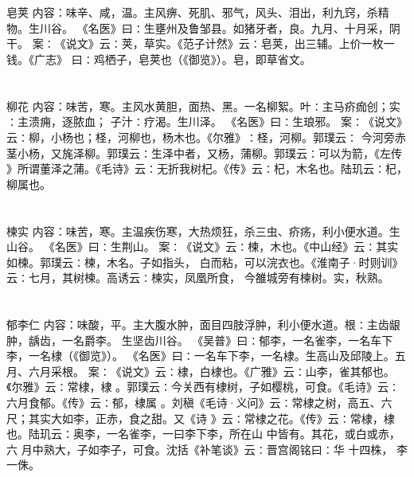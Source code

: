\documentclass[12pt,UTF8]{ctexbook}
\begin{document}
\chapter{}皂荚
内容：味辛、咸，温。主风痹、死肌、邪气，风头、泪出，利九窍，杀精物。生川谷。 
《名医》曰∶生壅州及鲁邹县。如猪牙者，良。九月、十月采，阴干。 
案∶《说文》云∶荚，草实。《范子计然》云∶皂荚，出三辅。上价一枚一钱。《广志》 
曰∶鸡栖子，皂荚也（《御览》）。皂，即草省文。 


\chapter{}柳花
内容：味苦，寒。主风水黄胆，面热、黑。一名柳絮。叶∶主马疥痂创；实∶主溃痈，逐脓血； 
子汁∶疗渴。生川泽。 
《名医》曰∶生琅邪。 
案∶《说文》云∶柳，小杨也；柽，河柳也，杨木也。《尔雅》∶柽，河柳。郭璞云∶ 
今河旁赤茎小杨，又旄泽柳。郭璞云∶生泽中者，又杨，蒲柳。郭璞云∶可以为箭，《左传 
》所谓董泽之蒲。《毛诗》云∶无折我树杞。《传》云∶杞，木名也。陆玑云∶杞，柳属也。 


\chapter{}楝实
内容：味苦，寒。主温疾伤寒，大热烦狂，杀三虫、疥疡，利小便水道。生山谷。 
《名医》曰∶生荆山。 
案∶《说文》云∶楝，木也。《中山经》云∶其实如楝。郭璞云∶楝，木名。子如指头， 
白而粘，可以浣衣也。《淮南子·时则训》云∶七月，其树楝。高诱云∶楝实，凤凰所食， 
今雒城旁有楝树。实，秋熟。 


\chapter{}郁李仁
内容：味酸，平。主大腹水肿，面目四肢浮肿，利小便水道。根∶主齿龈肿，龋齿，一名爵李。 
生坚齿川谷。 
《吴普》曰∶郁李，一名雀李，一名车下李，一名棣（《御览》）。 
《名医》曰∶一名车下李，一名棣。生高山及邱陵上。五月、六月采根。 
案∶《说文》云∶棣，白棣也。《广雅》云∶山李，雀其郁也。《尔雅》云∶常棣，棣 
。郭璞云∶今关西有棣树，子如樱桃，可食。《毛诗》云∶六月食郁。《传》云∶郁，棣属 
。刘稹《毛诗·义问》云∶常棣之树，高五、六尺；其实大如李，正赤，食之甜。又《诗 
》云∶常棣之花。《传》云∶常棣，棣也。陆玑云∶奥李，一名雀李，一曰李下李，所在山 
中皆有。其花，或白或赤，六 
月中熟大，子如李子，可食。沈括《补笔谈》云∶晋宫阁铭曰∶华 
十四株， 李一侏。 
\end{document}
